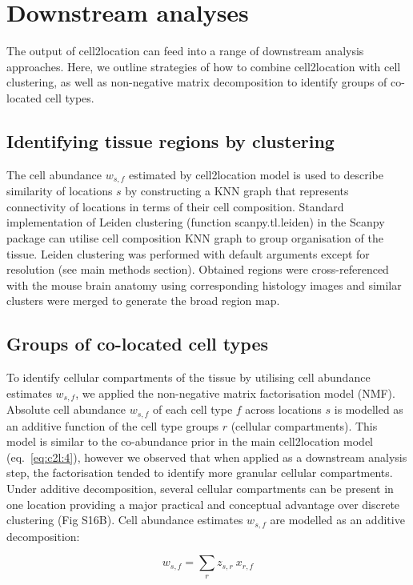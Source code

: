 \documentclass[11pt,a4paper]{article}
\begin{document}
\section{Downstream analyses}
The output of cell2location can feed into a range of downstream analysis approaches.
Here, we outline strategies of how to combine cell2location with cell clustering, as well as non-negative matrix decomposition to identify groups of co-located cell types.

\subsection{Identifying tissue regions by clustering} \label{auto_clustering}

The cell abundance $w_{s,f}$ estimated by cell2location model is used to describe similarity of locations $s$ by constructing a KNN graph that represents connectivity of locations in terms of their cell composition. Standard implementation of Leiden clustering (function scanpy.tl.leiden) in the Scanpy package \autocite{wolf_scanpy_2018} can utilise cell composition KNN graph to group organisation of the tissue. Leiden clustering was performed with default arguments except for resolution (see main methods section). Obtained regions were cross-referenced with the mouse brain anatomy using corresponding histology images and similar clusters were merged to generate the broad region map.

\subsection{Groups of co-located cell types} \label{cell_groups}

To identify cellular compartments of the tissue by utilising cell abundance estimates $w_{s,f}$, we applied the non-negative matrix factorisation model (NMF). Absolute cell abundance $w_{s,f}$ of each cell type $f$ across locations $s$ is modelled as an additive function of the cell type groups $r$ (cellular compartments). This model is similar to the co-abundance prior in the main cell2location model (eq.~\eqref{eq:c2l:4}), however we observed that when applied as a downstream analysis step, the factorisation tended to identify more granular cellular compartments. Under additive decomposition, several cellular compartments can be present in one location providing a major practical and conceptual advantage over discrete clustering (Fig S16B). Cell abundance estimates $w_{s,f}$ are modelled as an additive decomposition:  
\begin{linenomath*} \begin{equation} \label{eq:circ:1}
w_{s,f} = \sum_{r} {z_{s,r} \: x_{r,f}}
\end{equation} \end{linenomath*}
\end{document}
